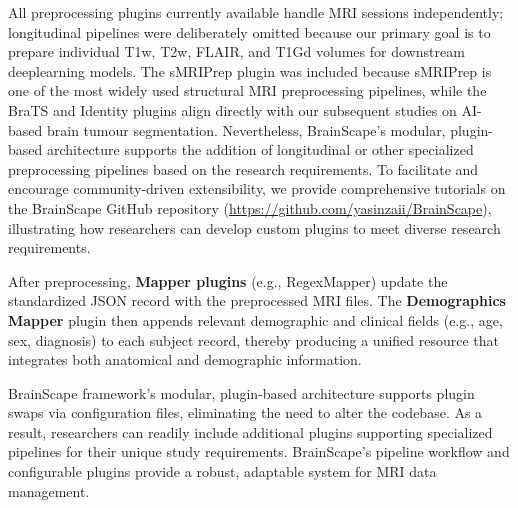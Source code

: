 All preprocessing plugins currently available handle MRI sessions independently; 
longitudinal pipelines were deliberately omitted because our primary goal is to prepare 
individual T1w, T2w, FLAIR, and T1Gd volumes for downstream deeplearning models.
The sMRIPrep plugin was included because sMRIPrep is one of the most widely used structural MRI preprocessing pipelines, 
while the BraTS and Identity plugins align directly with our subsequent studies on AI-based brain tumour segmentation.
Nevertheless, BrainScape's modular, plugin-based architecture supports the addition of longitudinal or 
other specialized preprocessing pipelines based on the research requirements. 
To facilitate and encourage community-driven extensibility, we provide comprehensive tutorials 
on the BrainScape GitHub repository (\url{https://github.com/yasinzaii/BrainScape}), 
illustrating how researchers can develop custom plugins to meet diverse research requirements.

After preprocessing, \textbf{Mapper plugins} (e.g., RegexMapper) update the standardized JSON record 
with the preprocessed MRI files. The \textbf{Demographics Mapper} plugin then appends relevant demographic 
and clinical fields (e.g., age, sex, diagnosis) to each subject record, thereby producing a unified 
resource that integrates both anatomical and demographic information.

BrainScape framework's modular, plugin-based architecture supports plugin swaps via configuration files, 
eliminating the need to alter the codebase. As a result, researchers can 
readily include additional plugins supporting specialized pipelines for their unique study requirements. 
BrainScape's pipeline workflow and configurable plugins provide a robust, adaptable system for MRI data management.


